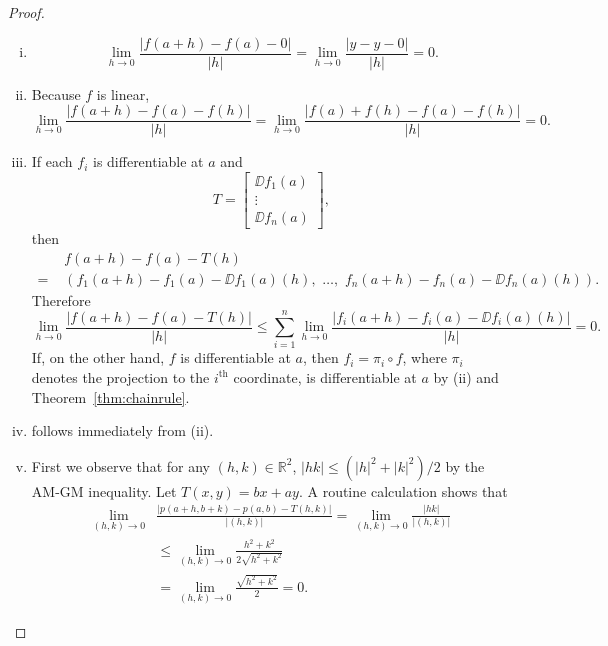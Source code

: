 \documentclass[11pt]{article}
\begin{document}
\begin{proof}
  \begin{enumerate}[(i)]
    \item 
\begin{equation*}
  \lim_{h \rightarrow 0} \frac{ | f(a+h) - f(a) - 0 | }{ |h| } 
  = \lim_{h \rightarrow 0} \frac{ |y - y - 0| }{ |h| } = 0.
\end{equation*}

\item Because $f$ is linear,
\begin{equation*}
  \lim_{h \rightarrow 0} \frac{ | f(a+h) - f(a) - f(h) | }{ |h| } 
  = \lim_{h \rightarrow 0} \frac{ | f(a) + f(h) - f(a) - f(h) | }{ |h|
  } = 0.
\end{equation*}

\item If each $f_i$ is differentiable at $a$ and
\begin{equation*}
  T = \begin{bmatrix} \DD f_1(a) \\ \vdots \\ \DD f_n(a) \end{bmatrix},
\end{equation*}
then
\begin{align*}
  &f(a+h) - f(a) - T(h) \\ =\,\, &( f_1(a+h) - f_1(a) - \DD f_1(a)(h), \,\,
  \dots, \,\, f_n(a+h) - f_n(a) - \DD f_n(a)(h)).
\end{align*}
Therefore
\begin{equation*}
  \lim_{h \rightarrow 0} \frac{ | f(a+h) - f(a) - T(h) | }{ |h|
  } \leqslant \sum_{i=1}^n \lim_{h \rightarrow 0} \frac{ | f_i(a+h) -
  f_i(a) - \DD f_i(a)(h) | }{ |h| } = 0.
\end{equation*}
If, on the other hand, $f$ is differentiable at $a$, then $f_i = \pi_i \circ f$, where $\pi_i$ denotes the projection to the $i^{\text{th}}$ coordinate, is differentiable at $a$ by (ii) and Theorem~\ref{thm:chainrule}.

\item follows immediately from (ii).

\item First we observe that for any $(h,k) \in \mathbb{R}^2$, $|hk| \leqslant (|h|^2 + |k|^2)/2$ by the AM-GM inequality.
Let $T(x,y) = bx + ay$.  A routine calculation shows that
\begin{align*}
  \lim_{(h,k) \rightarrow 0} &\frac{ | p(a+h, b+k) - p(a,b) -
  T(h,k) |}{|(h,k)|} = \lim_{(h,k) \rightarrow 0}
  \frac{|hk|}{|(h,k)|} \\ &\leqslant \lim_{(h,k) \rightarrow 0} \frac{h^2 +
  k^2}{ 2 \sqrt{h^2 + k^2} } \\ &= \lim_{(h,k) \rightarrow 0} \frac{\sqrt{h^2 +
  k^2}}{2} = 0.
\end{align*}
\end{enumerate}
\end{proof}
\end{document}
